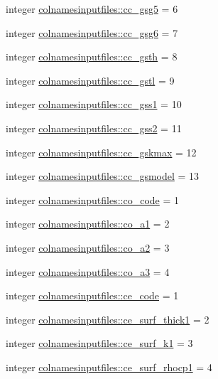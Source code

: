 \begin{DoxyCompactItemize}
integer \hyperlink{namespacecolnamesinputfiles_a71e9d63ba438f0913267aae404e38818}{colnamesinputfiles\+::cc\+\_\+gsg5} = 6
\item 
integer \hyperlink{namespacecolnamesinputfiles_aeaa624e5754e91d47966ba69ffc751ae}{colnamesinputfiles\+::cc\+\_\+gsg6} = 7
\item 
integer \hyperlink{namespacecolnamesinputfiles_a18fd573ea9a56a00bf52ded29be82113}{colnamesinputfiles\+::cc\+\_\+gsth} = 8
\item 
integer \hyperlink{namespacecolnamesinputfiles_a833936ceec60218a6b417edf5c1663eb}{colnamesinputfiles\+::cc\+\_\+gstl} = 9
\item 
integer \hyperlink{namespacecolnamesinputfiles_a921bc2e1949846db1a24b63e10326fb7}{colnamesinputfiles\+::cc\+\_\+gss1} = 10
\item 
integer \hyperlink{namespacecolnamesinputfiles_ae18f5dc0d06b71aac4b8b8d19c52c3d5}{colnamesinputfiles\+::cc\+\_\+gss2} = 11
\item 
integer \hyperlink{namespacecolnamesinputfiles_ab4dc64070726bebc6213f7d260ba52c3}{colnamesinputfiles\+::cc\+\_\+gskmax} = 12
\item 
integer \hyperlink{namespacecolnamesinputfiles_a107f2511e805ced3a88b5459b10cfbd3}{colnamesinputfiles\+::cc\+\_\+gsmodel} = 13
\item 
integer \hyperlink{namespacecolnamesinputfiles_a8126a74952ead81f96e91826ab641bed}{colnamesinputfiles\+::co\+\_\+code} = 1
\item 
integer \hyperlink{namespacecolnamesinputfiles_a639ab40155d861a89b4cda9091589c11}{colnamesinputfiles\+::co\+\_\+a1} = 2
\item 
integer \hyperlink{namespacecolnamesinputfiles_a4ab300855bf4009fd3c3f2c5cd60d114}{colnamesinputfiles\+::co\+\_\+a2} = 3
\item 
integer \hyperlink{namespacecolnamesinputfiles_a67f915a871a5baf877ec2a672756f3bd}{colnamesinputfiles\+::co\+\_\+a3} = 4
\item 
integer \hyperlink{namespacecolnamesinputfiles_a799f8e8515ced689357a0f69d0e9a099}{colnamesinputfiles\+::ce\+\_\+code} = 1
\item 
integer \hyperlink{namespacecolnamesinputfiles_a153c060f5889a5409df7478a24790c57}{colnamesinputfiles\+::ce\+\_\+surf\+\_\+thick1} = 2
\item 
integer \hyperlink{namespacecolnamesinputfiles_a31aa551bebd47492d96ee41765b13b4c}{colnamesinputfiles\+::ce\+\_\+surf\+\_\+k1} = 3
\item 
integer \hyperlink{namespacecolnamesinputfiles_a9271ff7b1339135ae95c5d9f44301d27}{colnamesinputfiles\+::ce\+\_\+surf\+\_\+rhocp1} = 4

\end{DoxyCompactItemize}

